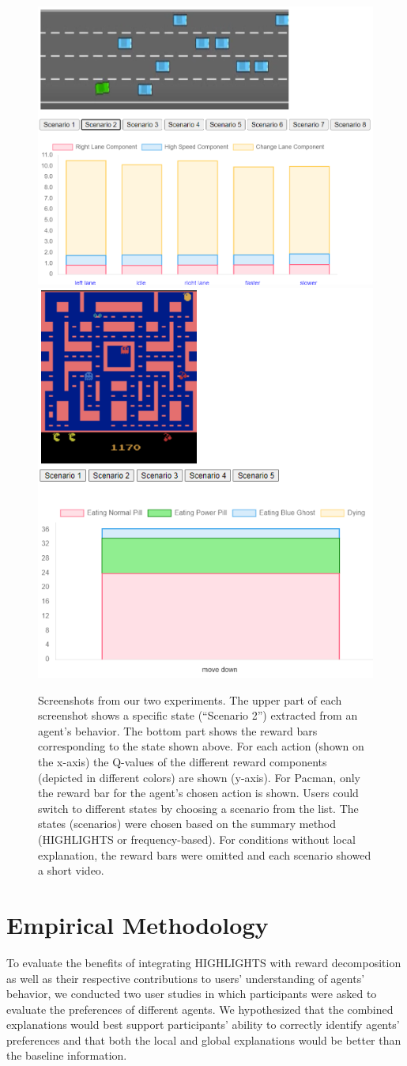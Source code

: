 \documentclass[runningheads]{llncs}
\begin{document}
\begin{figure}[t]
\centering
\includegraphics[width=0.49\linewidth]{example_from_survey.PNG}
\hfill
\includegraphics[width=0.39\linewidth]{Survey_example_Pacman.PNG}
\caption{Screenshots from our two experiments. The upper part of each screenshot shows a specific state (``Scenario 2'') extracted from an agent's behavior. The bottom part shows the reward bars corresponding to the state shown above. For each action (shown on the x-axis) the Q-values of the different reward components (depicted in different colors) are shown (y-axis). For Pacman, only the reward bar for the agent's chosen action is shown. Users could switch to different states by choosing a scenario from the list. The states (scenarios) were chosen based on the summary method (HIGHLIGHTS or frequency-based). For conditions without local explanation, the reward bars were omitted and each scenario showed a short video.}

\label{fig:example_from_survey}
\vspace{-0.2cm}
\end{figure}


\section{Empirical Methodology}
To evaluate the benefits of integrating HIGHLIGHTS with reward decomposition as well as their respective contributions to users' understanding of agents' behavior, we conducted two user studies in which participants were asked to evaluate the preferences of different agents. 
We hypothesized that the combined explanations would best support participants' ability to correctly identify agents' preferences and that both the local and global explanations would be better than the baseline information. 
\end{document}
